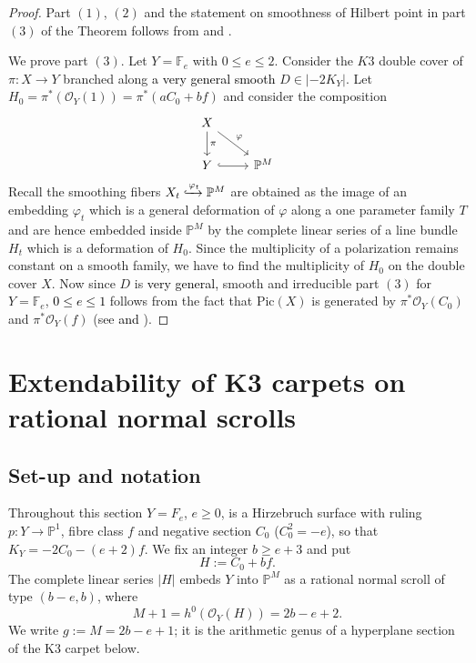 \documentclass[11pt,reqno]{amsart}
\theoremstyle{plain}
\theoremstyle{definition}
\newcommand{\PP}{\mathbb{P}}
\newcommand{\PM}{\mathbb{P}^M}
\newcommand{\OO}{\mathcal{O}}
\begin{document}
\begin{proof} Part $(1)$, $(2)$ and the statement on smoothness of Hilbert point in part $(3)$ of the Theorem follows from \cite[Theorem $3.1 (3)$, Theorem $4.3$, Theorem $4.4$, Theorem $5.1$]{BMR21} and \cite[Proposition $1.7$, Theorem $3.5$, Theorem $4.1$]{GP97}.
    

We prove part $(3)$. Let $Y = \mathbb{F}_e$ with $0 \leq e \leq 2$. Consider the $K3$ double cover of $\pi:X \to Y$ branched along \textcolor{black}{a very general smooth} $D \in |-2K_Y|$. Let $H_0 = \pi^*(\mathcal{O}_{Y}(1)) = \pi^*(aC_0+bf)$ and consider the composition  
\[
\begin{tikzcd}
X \arrow[dr, "\varphi"] \arrow[d, "\pi"] & \\
Y \arrow[r, hook] & \mathbb{P}^M
\end{tikzcd}
\]
Recall the smoothing fibers $X_t \xhookrightarrow{\varphi_t} \mathbb{P}^M$ are obtained as the image of an embedding $\varphi_t$ which is a general deformation of $\varphi$ along a one parameter family $T$ and are hence embedded inside $\mathbb{P}^M$ by the complete linear series of a line bundle $H_t$ which is a deformation of $H_0$. Since the multiplicity of a polarization remains constant on a smooth family, we have to find the multiplicity of $H_0$ on the double cover $X$. Now since $D$ is \textcolor{black}{very general,} smooth and irreducible part $(3)$ for $Y = \mathbb{F}_e$, \textcolor{black}{$0 \leq e \leq 1$} follows from the fact that $\textrm{Pic}(X)$ is generated by $\pi^*\mathcal{O}_Y(C_0)$ and $\pi^*\mathcal{O}_Y(f)$ (see \cite[Proposition $6.3$]{AHL10} \textcolor{black}{and \cite[Proposition $6.5$ (i), (iii)]{AHL10}}).

\end{proof}

\section{Extendability of K3 carpets on rational normal scrolls}\label{sec:carpets}



\subsection{Set-up and notation}\label{subsec:setup}

Throughout this section $Y=F_e$, $e\ge 0$, is a Hirzebruch surface with ruling $p\colon Y\to\PP^1$, fibre class $f$ and negative section $C_0$ ($C_0^2=-e$), so that $K_Y=-2C_0-(e+2)f$. We fix an integer $b\ge e+3$ and put
\[
H:=C_0+bf .
\]
The complete linear series $|H|$ embeds $Y$ into $\PM$ as a rational normal scroll of type $(b-e,b)$, where
\[
M+1=h^0(\OO_Y(H))=2b-e+2 .
\]
We write $g:=M=2b-e+1$; it is the arithmetic genus of a hyperplane section of the K3 carpet below.
\end{document}
